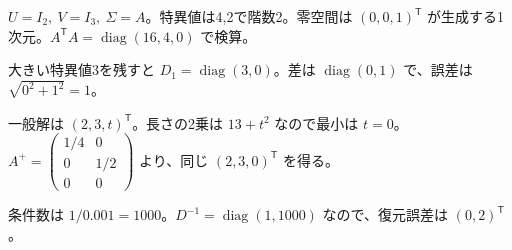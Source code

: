 \documentclass[11pt]{article}
\begin{document}

\problem[長方形行列のSVD]
\begin{ans}
$U=I_2,\ V=I_3,\ \Sigma=A$。特異値は4,2で階数2。零空間は $(0,0,1)^{\mathsf T}$ が生成する1次元。$A^{\mathsf T}A=\operatorname{diag}(16,4,0)$ で検算。
\end{ans}

\problem[低ランク近似]
\begin{ans}
大きい特異値3を残すと $D_1=\operatorname{diag}(3,0)$。差は $\operatorname{diag}(0,1)$ で、誤差は $\sqrt{0^2+1^2}=1$。
\end{ans}
\newpage

\problem[擬似逆と最小ノルム]
\begin{ans}
一般解は $(2,3,t)^{\mathsf T}$。長さの2乗は $13+t^2$ なので最小は $t=0$。$A^+=\begin{pmatrix}1/4&0\\0&1/2\\0&0\end{pmatrix}$ より、同じ $(2,3,0)^{\mathsf T}$ を得る。
\end{ans}

\problem[誤差増幅]
\begin{ans}
条件数は $1/0.001=1000$。$D^{-1}=\operatorname{diag}(1,1000)$ なので、復元誤差は $(0,2)^{\mathsf T}$。
\end{ans}
\end{document}
